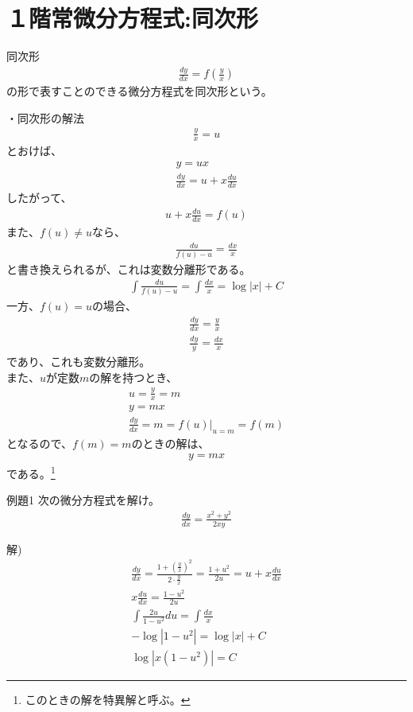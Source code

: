 \documentclass{jsarticle}
\begin{document}
\section{１階常微分方程式:同次形}
\begin{itembox}[l]{同次形}
\begin{eqnarray}
\frac{dy}{dx}=f\left(\frac{y}{x}\right)
\end{eqnarray}
の形で表すことのできる微分方程式を同次形という。
\end{itembox}
・同次形の解法
\begin{eqnarray}
\frac{y}{x}=u
\end{eqnarray}
とおけば、
\begin{eqnarray}
y=ux\\
\frac{dy}{dx}=u+x\frac{du}{dx}
\end{eqnarray}
したがって、
\begin{eqnarray}
u+x\frac{du}{dx}=f(u)
\end{eqnarray}
また、$f(u)\neq u$なら、
\begin{eqnarray}
\frac{du}{f(u)-u}=\frac{dx}{x}
\end{eqnarray}
と書き換えられるが、これは変数分離形である。
\begin{eqnarray}
\int \frac{du}{f(u)-u}=\int \frac{dx}{x}=\log |x| +C
\end{eqnarray}
一方、$f(u)=u$の場合、
\begin{eqnarray}
\frac{dy}{dx}=\frac{y}{x}\\
\frac{dy}{y}=\frac{dx}{x}
\end{eqnarray}
であり、これも変数分離形。\\
また、$u$が定数$m$の解を持つとき、
\begin{eqnarray}
u=\frac{y}{x}=m\\
y=mx \\
\frac{dy}{dx}=m=f(u)\left. \right|_{u=m}=f(m)
\end{eqnarray}
となるので、$f(m)=m$のときの解は、
\begin{eqnarray}
y=mx
\end{eqnarray}
である。\footnote{このときの解を特異解と呼ぶ。}\\
\begin{itembox}[l]{例題1}
次の微分方程式を解け。
\begin{eqnarray}
\frac{dy}{dx}=\frac{x^2+y^2}{2xy}
\end{eqnarray}
\end{itembox}
解)
\begin{eqnarray}
\frac{dy}{dx}=\frac{1+\left(\frac{y}{x}\right)^2}{2\cdot\frac{y}{x}}=\frac{1+u^2}{2u}=u+x\frac{du}{dx}\\
x\frac{du}{dx}=\frac{1-u^2}{2u}\\
\int \frac{2u}{1-u^2}du = \int \frac{dx}{x}\\
-\log |1-u^2| = \log |x|  + C\\
\log|x(1-u^2)|=C
\end{eqnarray}
\end{document}
